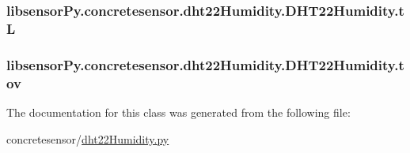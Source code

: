 \subsubsection[{t\+L}]{\setlength{\rightskip}{0pt plus 5cm}libsensor\+Py.\+concretesensor.\+dht22\+Humidity.\+D\+H\+T22\+Humidity.\+t\+L}\label{classlibsensorPy_1_1concretesensor_1_1dht22Humidity_1_1DHT22Humidity_aeabec943e4cae663f674f52ad2a1e4b7}
\hypertarget{classlibsensorPy_1_1concretesensor_1_1dht22Humidity_1_1DHT22Humidity_a0fa0edfa0d154e1fa35876d16725178b}{}
\subsubsection[{tov}]{\setlength{\rightskip}{0pt plus 5cm}libsensor\+Py.\+concretesensor.\+dht22\+Humidity.\+D\+H\+T22\+Humidity.\+tov}\label{classlibsensorPy_1_1concretesensor_1_1dht22Humidity_1_1DHT22Humidity_a0fa0edfa0d154e1fa35876d16725178b}


The documentation for this class was generated from the following file\+:\begin{DoxyCompactItemize}
\item 
concretesensor/\hyperlink{concretesensor_2dht22Humidity_8py}{dht22\+Humidity.\+py}\end{DoxyCompactItemize}
